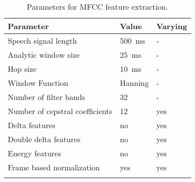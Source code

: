 \begin{table}[ht!]
\small
\begin{center}
\caption{Parameters for MFCC feature extraction.}
\begin{tabular}{ M{6cm}  M{2cm} M{2cm}}
\toprule
\textbf{Parameter} & \textbf{Value} & \textbf{Varying} \\
\midrule
Speech signal length & \SI{500}{\milli\second} & - \\
Analytic window size & \SI{25}{\milli\second} & -\\
Hop size & \SI{10}{\milli\second} & -\\
Window Function & Hanning & -\\
\midrule
Number of filter bands & 32 & -\\
Number of cepstral coefficients & 12 & yes\\
Delta features & no & yes \\
Double delta features & no & yes \\
Energy features & no 	& yes \\
Frame based normalization & yes & yes\\
\bottomrule
\label{tab:exp_details_params_feature}
\end{tabular}
\end{center}
\vspace{-4mm}
\end{table}
\FloatBarrier
\noindent